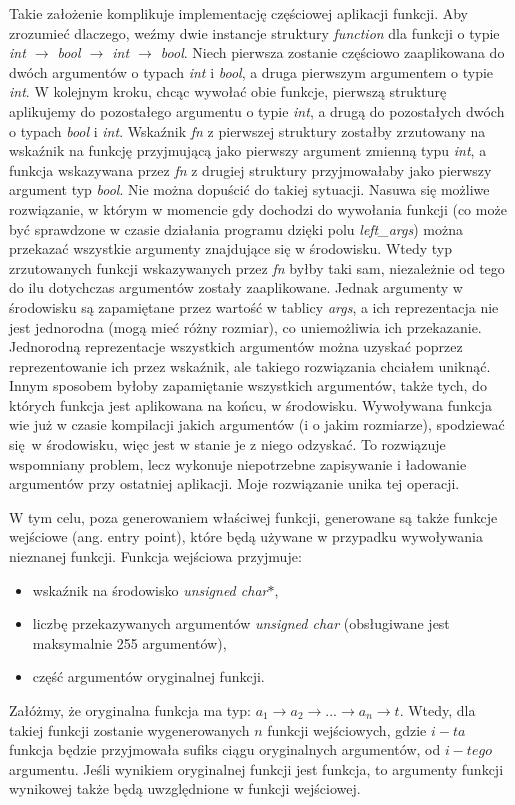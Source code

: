 \documentclass[declaration,shortabstract]{iithesis}
\begin{document}
Takie założenie komplikuje implementację częściowej aplikacji funkcji. Aby 
zrozumieć dlaczego, weźmy dwie instancje struktury \textit{function} dla 
funkcji o typie \textit{int $\rightarrow$ bool $\rightarrow$ int 
$\rightarrow$ bool}. Niech pierwsza zostanie częściowo zaaplikowana do dwóch 
argumentów o typach \textit{int} i \textit{bool}, a druga pierwszym argumentem
o typie \textit{int}. W kolejnym kroku, chcąc wywołać obie funkcje, 
pierwszą strukturę aplikujemy do pozostałego argumentu o typie \textit{int}, a
drugą do pozostałych dwóch o typach \textit{bool} i \textit{int}. Wskaźnik \textit
{fn} z pierwszej struktury zostałby zrzutowany na wskaźnik na funkcję 
przyjmującą jako pierwszy argument zmienną typu \textit{int}, a funkcja 
wskazywana przez \textit{fn} z drugiej struktury przyjmowałaby jako pierwszy 
argument typ \textit{bool}. Nie można dopuścić do takiej sytuacji. Nasuwa się 
możliwe rozwiązanie, w którym w momencie gdy dochodzi do wywołania funkcji (co 
może być sprawdzone w czasie działania programu dzięki polu 
\textit{left\_args}) można przekazać wszystkie argumenty znajdujące się w 
środowisku. Wtedy typ zrzutowanych funkcji wskazywanych przez \textit{fn} byłby 
taki sam, niezależnie od tego do ilu dotychczas argumentów zostały zaaplikowane.
Jednak argumenty w środowisku są zapamiętane przez wartość w tablicy \textit
{args}, a ich reprezentacja nie jest jednorodna (mogą mieć różny rozmiar),
co uniemożliwia ich przekazanie.
Jednorodną reprezentacje wszystkich argumentów można uzyskać poprzez 
reprezentowanie ich przez wskaźnik, ale takiego rozwiązania chciałem uniknąć.
Innym sposobem byłoby zapamiętanie wszystkich argumentów, także tych,
do których funkcja jest aplikowana na końcu, w środowisku. 
Wywoływana funkcja wie już w czasie 
kompilacji jakich argumentów (i o jakim rozmiarze), spodziewać się w środowisku,
więc jest w stanie je z niego odzyskać. To rozwiązuje wspomniany 
problem, lecz wykonuje niepotrzebne zapisywanie i ładowanie argumentów 
przy ostatniej aplikacji. Moje rozwiązanie unika tej operacji. 

W tym celu, poza generowaniem właściwej funkcji, generowane są także funkcje 
wejściowe (ang. entry point), które będą używane w przypadku wywoływania 
nieznanej funkcji. 
Funkcja wejściowa przyjmuje: 
\begin{itemize}
  \item wskaźnik na środowisko \textit{unsigned char$\ast$},
  \item liczbę przekazywanych argumentów \textit{unsigned char} 
  (obsługiwane jest maksymalnie 255 argumentów),
  \item część argumentów oryginalnej funkcji.
\end{itemize}
Załóżmy, że oryginalna funkcja ma typ: $a_1 \rightarrow a_2 \rightarrow ...
\rightarrow a_n \rightarrow t$. Wtedy, dla takiej funkcji zostanie wygenerowanych $n$ funkcji 
wejściowych, gdzie $i-ta$ funkcja będzie przyjmowała sufiks ciągu oryginalnych
argumentów, od $i-tego$ argumentu. Jeśli wynikiem oryginalnej funkcji jest 
funkcja, to argumenty funkcji wynikowej także będą uwzględnione w funkcji wejściowej.
\end{document}

